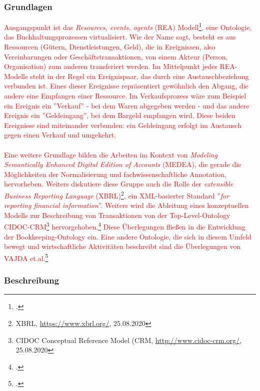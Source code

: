 \documentclass[12pt,a4paper]{article}
\begin{document}
\subsubsection{Grundlagen}
\textcolor{red}{
Ausgangspunkt ist das \textit{Resources, events, agents} (REA) Modell\footcite{mccarthy1982rea}, eine Ontologie, das Buchhaltungsprozessen virtualisiert. Wie der Name sagt, besteht es aus Ressourcen (Gütern, Dienstleistungen, Geld), die in Ereignissen, also Vereinbarungen oder Geschäftstransaktionen, von einem Akteur (Person, Organisation) zum anderen transferiert werden. Im Mittelpunkt jedes REA-Modells steht in der Regel ein Ereignispaar, das durch eine Austauschbeziehung verbunden ist. Eines dieser Ereignisse repräsentiert gewöhnlich den Abgang, die andere eine Empfangen einer Ressource. Im Verkaufsprozess wäre zum Beispiel ein Ereignis ein ''Verkauf'' - bei dem Waren abgegeben werden - und das andere Ereignis ein ''Geldeingang'', bei dem Bargeld empfangen wird. Diese beiden Ereignisse sind miteinander verbunden: ein Geldeingang erfolgt im Austausch gegen einen Verkauf und umgekehrt.
\\
\\
Eine weitere Grundlage bilden die Arbeiten im Kontext von \textit{Modeling Semantically Enhanced Digital Edition of Accounts} (MEDEA), die gerade die Möglichkeiten der Normalisierung und fachwissenschaftliche Annotation, hervorheben. Weiters diskutiere diese Gruppe auch die Rolle der \textit{extensible Business Reporting Language} (XBRL)\footnote{XBRL, \url{https://www.xbrl.org/}, 25.08.2020}, ein XML-basierter Standard ''\textit{for reporting financial information}''. Weiters wird die Ableitung eines konzeptuellen Modells zur Beschreibung von Transaktionen von der Top-Level-Ontology CIDOC-CRM\footnote{CIDOC Conceptual Reference Model (CRM, \url{http://www.cidoc-crm.org/}, 25.08.2020} hervorgehoben.\footcite[][S.9-12]{tomasekmedea} Diese Überlegungen fließen in die Entwicklung der Bookkeeping-Ontology ein. Eine andere Ontologie, die sich in diesem Umfeld bewegt und wirtschaftliche Aktivitäten beschreibt sind die Überlegungen von VAJDA et.al.\footcite[][]{vajda2019toward}
}

\subsubsection{Beschreibung}
\end{document}

